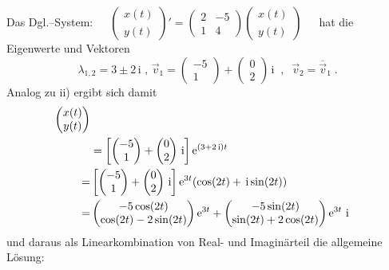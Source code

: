 {\begin{iii}
\item  Das Dgl.--System:\ \ \ $
\begin{pmatrix}
x(t) \\ 
y(t)
\end{pmatrix}
 '=
\begin{pmatrix}
2 & -5 \\ 
1 & 4
\end{pmatrix}
\begin{pmatrix}
x(t) \\ 
y(t)
\end{pmatrix}
 $\ \ \ hat die Eigenwerte und Vektoren 
\[
\lambda _{1,2}=3\pm 2\,\text{i\ \ ,\ \ \ }
\vec{v}_{1}=\begin{pmatrix}
-5 \\ 
1
\end{pmatrix}
+\begin{pmatrix}
0 \\ 
2
\end{pmatrix}
 \,\text{i}\;\;,\;\;\vec{v}_{2}=\overline{\vec{v}}_{1}\;. 
\]
Analog zu ii) ergibt sich damit 
\begin{align*}
\begin{pmatrix}
x(t) \\ 
y(t)
\end{pmatrix}\\
&= \left[\begin{pmatrix} -5 \\1\end{pmatrix}
+ \begin{pmatrix}0\\2\end{pmatrix}\,\mathrm{i} \right] \mathrm{e}^{(3+2\,\mathrm{i})t}\\
=& \left[\begin{pmatrix} -5 \\1\end{pmatrix}
+ \begin{pmatrix}0\\2\end{pmatrix}\,\mathrm{i} \right] \mathrm{e}^{3t}(\cos(2t) + \,\mathrm{i} \sin(2t))\\
=& \begin{pmatrix} -5 \cos(2t)\\\cos(2t)-2\sin(2t)\end{pmatrix} \mathrm{e}^{3t}
+ \begin{pmatrix}-5\sin(2t)\\\sin(2t)+2\cos(2t)\end{pmatrix}\mathrm{e}^{3t}\,\,\mathrm{i}
\end{align*}
und daraus als Linearkombination von Real- und Imagin\"arteil die allgemeine L\"osung:

\end{iii}}
